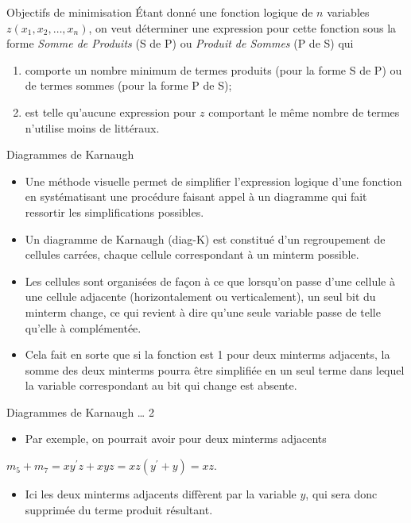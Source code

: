 \documentclass[presentation]{beamer}
\begin{document}
\begin{frame}[label={sec:orgf02ffd6}]{Objectifs de minimisation}
Étant donné une fonction logique de \(n\) variables \(z(x_1, x_2, \ldots, x_n)\), on veut déterminer une expression pour cette fonction sous la forme \emph{Somme de Produits} (S de P) ou \emph{Produit de Sommes} (P de S) qui

\begin{enumerate}
\item comporte un nombre minimum de termes produits (pour la forme S de P)
ou de termes sommes (pour la forme P de S);

\item est telle qu'aucune expression pour \(z\) comportant le même nombre
de termes n'utilise moins de littéraux.
\end{enumerate}
\end{frame}

\begin{frame}[label={sec:orgc44d004}]{Diagrammes de Karnaugh}
\begin{itemize}
\item Une méthode visuelle permet de simplifier l'expression logique d'une fonction en systématisant une procédure faisant appel à un diagramme qui fait ressortir les simplifications possibles.

\item Un diagramme de Karnaugh (diag-K) est constitué d'un regroupement de cellules carrées, chaque cellule correspondant à un minterm possible.

\item Les cellules sont organisées de façon à ce que lorsqu'on passe d'une cellule à une cellule adjacente (horizontalement ou verticalement), un seul bit du minterm change, ce qui revient à dire qu'une seule variable passe de telle qu'elle à complémentée.

\item Cela fait en sorte que si la fonction est 1 pour deux minterms adjacents, la somme des deux minterms pourra être simplifiée en un seul terme dans lequel la variable correspondant au bit qui change est absente.
\end{itemize}
\end{frame}

\begin{frame}[label={sec:orgfeb22d6}]{Diagrammes de Karnaugh \ldots{} 2}
\begin{itemize}
\item Par exemple, on pourrait avoir pour deux minterms adjacents
\end{itemize}

\(m_5 + m_7 = xy^\prime z + xyz = xz(y^\prime + y) = xz\). 

\begin{itemize}
\item Ici les deux minterms adjacents diffèrent par la variable \(y\), qui sera donc supprimée du terme produit résultant.
\end{itemize}
\end{frame}
\end{document}
